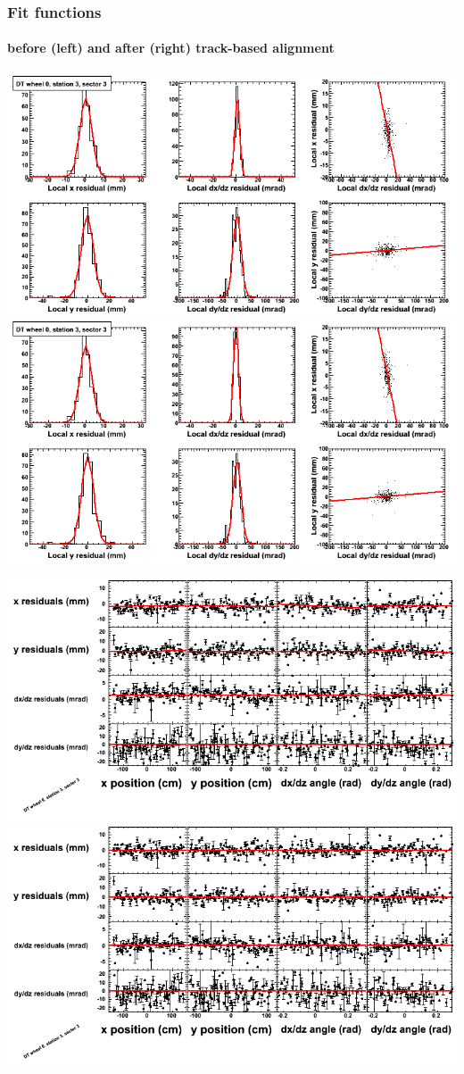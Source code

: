 \documentclass[compress]{beamer}
\begin{document}
\begin{frame}
\frametitle{Fit functions}
\framesubtitle{before (left) and after (right) track-based alignment}
\includegraphics[width=0.5\linewidth]{fitfunctions_re01/MBwhCst3sec03_bellcurves.png} \includegraphics[width=0.5\linewidth]{fitfunctions_re05/MBwhCst3sec03_bellcurves.png}

\includegraphics[width=0.5\linewidth]{fitfunctions_re01/MBwhCst3sec03_polynomials.png} \includegraphics[width=0.5\linewidth]{fitfunctions_re05/MBwhCst3sec03_polynomials.png}
\end{frame}
\end{document}
